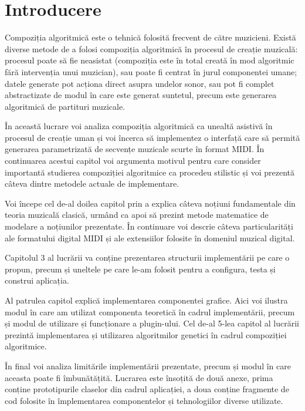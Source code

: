 \section{Introducere}
\noindent Compoziția algoritmică este o tehnică folosită frecvent de către muzicieni. Există diverse metode de a folosi compoziția algoritmică în procesul de creație muzicală: procesul poate să fie neasistat (compoziția este în total creată în mod algoritmic fără intervenția unui muzician), sau poate fi centrat în jurul componentei umane; datele generate pot acționa direct asupra undelor sonor, sau pot fi complet abstractizate de modul în care este generat suntetul, precum este generarea algoritmică de partituri muzicale. \par 
În această lucrare voi analiza compoziția algoritmică ca unealtă asistivă în procesul de creație uman și voi încerca să implementez o interfață care să permită generarea parametrizată de secvențe muzicale scurte în format MIDI. În continuarea acestui capitol voi argumenta motivul pentru care consider importantă studierea compoziției algoritmice ca procedeu stilistic și voi prezentă câteva dintre metodele actuale de implementare. 
\par Voi începe cel de-al doilea capitol prin a explica câteva noțiuni fundamentale din teoria muzicală clasică, urmând ca apoi să prezint metode matematice de modelare a noțiunilor prezentate. În continuare voi descrie câteva particularități ale formatului digital MIDI și ale extensiilor folosite în domeniul muzical digital.
\par Capitolul 3 al lucrării va conține prezentarea structurii implementării pe care o propun, precum și uneltele pe care le-am folosit pentru a configura, testa și construi aplicația.
\par Al patrulea capitol explică implementarea componentei grafice. Aici voi ilustra modul în care am utilizat componenta teoretică în cadrul implementării, precum și modul de utilizare și funcționare a plugin-ului. Cel de-al 5-lea capitol al lucrării prezintă implementarea și utilizarea algoritmilor genetici în cadrul compoziției algoritmice.
\par În final voi analiza limitările implementării prezentate, precum și modul în care aceasta poate fi îmbunătățită. Lucrarea este însoțită de două anexe, prima conține prototipurile claselor din cadrul aplicației, a doua conține fragmente de cod folosite în împlementarea componentelor și tehnologiilor diverse utilizate.
